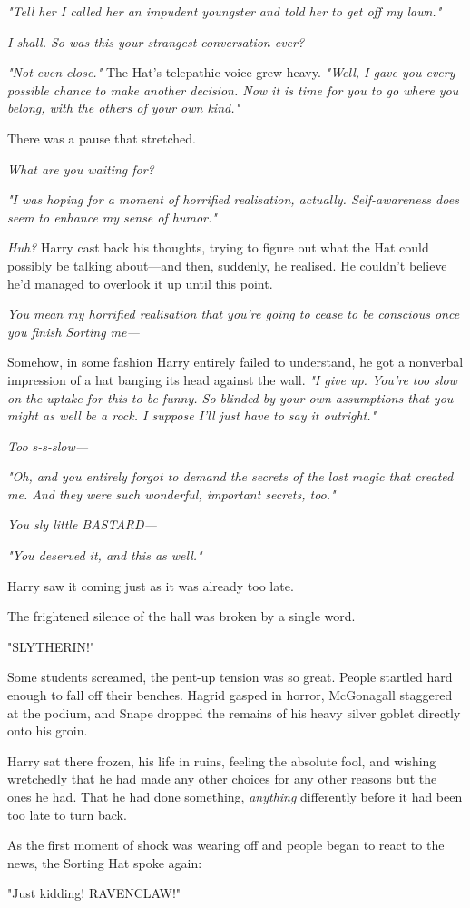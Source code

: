 \emph{"Tell her I called her an impudent youngster and told her to get off my lawn."}

\emph{I shall. So was this your strangest conversation ever?}

\emph{"Not even close."} The Hat's telepathic voice grew heavy.\emph{ "Well, I gave you every possible chance to make another decision. Now it is time for you to go where you belong, with the others of your own kind."}

There was a pause that stretched.

\emph{What are you waiting for?}

\emph{"I was hoping for a moment of horrified realisation, actually. Self-awareness does seem to enhance my sense of humor."}

\emph{Huh?} Harry cast back his thoughts, trying to figure out what the Hat could possibly be talking about---and then, suddenly, he realised. He couldn't believe he'd managed to overlook it up until this point.

\emph{You mean my horrified realisation that you're going to cease to be conscious once you finish Sorting me---}

Somehow, in some fashion Harry entirely failed to understand, he got a nonverbal impression of a hat banging its head against the wall. \emph{"I give up. You're too slow on the uptake for this to be funny. So blinded by your own assumptions that you might as well be a rock. I suppose I'll just have to say it outright."}

\emph{Too s-s-slow---}

\emph{"Oh, and you entirely forgot to demand the secrets of the lost magic that created me. And they were such wonderful, important secrets, too."}

\emph{You sly little BASTARD---}

\emph{"You deserved it, and this as well."}

Harry saw it coming just as it was already too late.

The frightened silence of the hall was broken by a single word.

"SLYTHERIN!"

Some students screamed, the pent-up tension was so great. People startled hard enough to fall off their benches. Hagrid gasped in horror, McGonagall staggered at the podium, and Snape dropped the remains of his heavy silver goblet directly onto his groin.

Harry sat there frozen, his life in ruins, feeling the absolute fool, and wishing wretchedly that he had made any other choices for any other reasons but the ones he had. That he had done something, \emph{anything} differently before it had been too late to turn back.

As the first moment of shock was wearing off and people began to react to the news, the Sorting Hat spoke again:

"Just kidding! RAVENCLAW!"